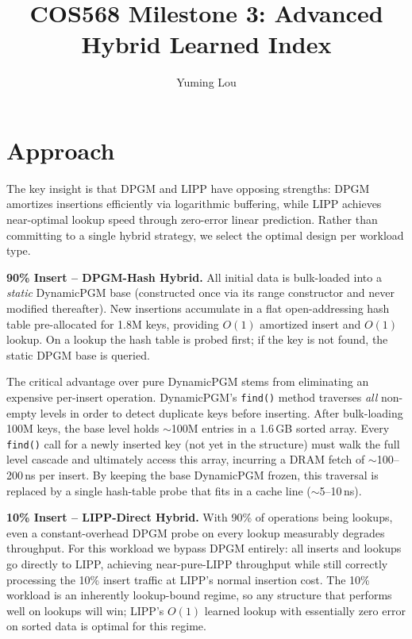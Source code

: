 \documentclass[11pt,letterpaper]{article}
\title{\textbf{COS568 Milestone 3: Advanced Hybrid Learned Index}}
\author{Yuming Lou}
\date{}
\begin{document}
\maketitle

\section{Approach}

The key insight is that DPGM and LIPP have opposing strengths: DPGM amortizes
insertions efficiently via logarithmic buffering, while LIPP achieves near-optimal
lookup speed through zero-error linear prediction.
Rather than committing to a single hybrid strategy, we select the optimal design
per workload type.

\textbf{90\% Insert -- DPGM-Hash Hybrid.}
All initial data is bulk-loaded into a \emph{static} DynamicPGM base (constructed
once via its range constructor and never modified thereafter).
New insertions accumulate in a flat open-addressing hash table pre-allocated for
1.8M keys, providing $O(1)$ amortized insert and $O(1)$ lookup.
On a lookup the hash table is probed first; if the key is not found, the static
DPGM base is queried.

The critical advantage over pure DynamicPGM stems from eliminating an expensive
per-insert operation.
DynamicPGM's \texttt{find()} method traverses \emph{all} non-empty levels in
order to detect duplicate keys before inserting.
After bulk-loading 100M keys, the base level holds $\sim$100M entries in a
1.6\,GB sorted array.
Every \texttt{find()} call for a newly inserted key (not yet in the structure)
must walk the full level cascade and ultimately access this array, incurring a
DRAM fetch of $\sim$100--200\,ns per insert.
By keeping the base DynamicPGM frozen, this traversal is replaced by a single
hash-table probe that fits in a cache line ($\sim$5--10\,ns).

\textbf{10\% Insert -- LIPP-Direct Hybrid.}
With 90\% of operations being lookups, even a constant-overhead DPGM probe on
every lookup measurably degrades throughput.
For this workload we bypass DPGM entirely: all inserts and lookups go directly
to LIPP, achieving near-pure-LIPP throughput while still correctly processing
the 10\% insert traffic at LIPP's normal insertion cost.
The 10\% workload is an inherently lookup-bound regime, so any structure that
performs well on lookups will win; LIPP's $O(1)$ learned lookup with essentially
zero error on sorted data is optimal for this regime.
\end{document}
